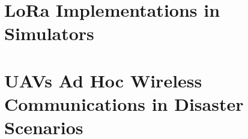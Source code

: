 \section{LoRa Implementations in Simulators}


\section{\glspl{UAV} Ad Hoc Wireless Communications in Disaster Scenarios}

   
%
%
